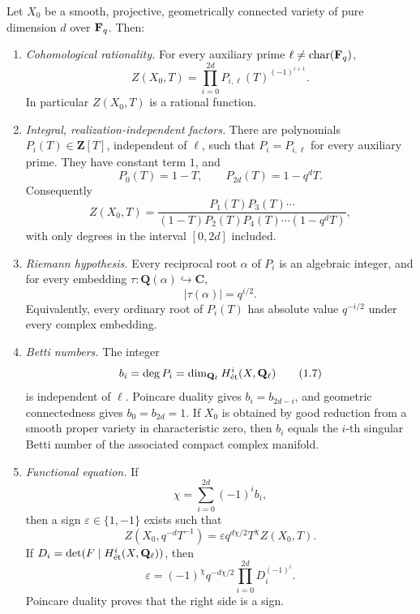 \begin{theorem}
\label{thm:weil-conjectures-statement}
Let \(X_0\) be a smooth, projective, geometrically connected variety of
pure dimension \(d\) over \(\mathbf F_q\).  Then:

\begin{enumerate}
\item \emph{Cohomological rationality.}  For every auxiliary prime
      \(\ell\neq\operatorname{char}(\mathbf F_q)\),
      \[
        Z(X_0,T)
        =\prod_{i=0}^{2d}P_{i,\ell}(T)^{(-1)^{i+1}}.
        \tag{1.4}\label{eq:weil-cohomological-factorization}
      \]
      In particular \(Z(X_0,T)\) is a rational function.

\item \emph{Integral, realization-independent factors.}  There are
      polynomials \(P_i(T)\in\mathbf Z[T]\), independent of \(\ell\),
      such that \(P_i=P_{i,\ell}\) for every auxiliary prime.  They have
      constant term \(1\), and
      \[
        P_0(T)=1-T,\qquad P_{2d}(T)=1-q^dT.
        \tag{1.5}\label{eq:weil-endpoints}
      \]
      Consequently
      \[
        Z(X_0,T)=
        \frac{P_1(T)P_3(T)\cdots}
        {(1-T)P_2(T)P_4(T)\cdots(1-q^dT)},
      \]
      with only degrees in the interval \([0,2d]\) included.

\item \emph{Riemann hypothesis.}  Every reciprocal root \(\alpha\) of
      \(P_i\) is an algebraic integer, and for every embedding
      \(\tau\colon\mathbf Q(\alpha)\hookrightarrow\mathbf C\),
      \[
        |\tau(\alpha)|=q^{i/2}.
        \tag{1.6}\label{eq:weil-rh}
      \]
      Equivalently, every ordinary root of \(P_i(T)\) has absolute value
      \(q^{-i/2}\) under every complex embedding.

\item \emph{Betti numbers.}  The integer
      \[
        b_i=\deg P_i=\dim_{\mathbf Q_\ell}H^i_{\mathrm{\acute et}}(X,\mathbf Q_\ell)
        \tag{1.7}\label{eq:weil-betti}
      \]
      is independent of \(\ell\).  Poincare duality gives
      \(b_i=b_{2d-i}\), and geometric connectedness gives
      \(b_0=b_{2d}=1\).  If \(X_0\) is obtained by good reduction from a
      smooth proper variety in characteristic zero, then \(b_i\) equals
      the \(i\)-th singular Betti number of the associated compact
      complex manifold.

\item \emph{Functional equation.}  If
      \[
        \chi=\sum_{i=0}^{2d}(-1)^ib_i,
      \]
      then a sign \(\varepsilon\in\{1,-1\}\) exists such that
      \[
        Z(X_0,q^{-d}T^{-1})
        =\varepsilon q^{d\chi/2}T^\chi Z(X_0,T).
        \tag{1.8}\label{eq:weil-functional-equation}
      \]
      If \(D_i=\det(F\mid H^i_{\mathrm{\acute et}}(X,\mathbf Q_\ell))\), then
      \[
        \varepsilon=(-1)^\chi q^{-d\chi/2}
          \prod_{i=0}^{2d}D_i^{(-1)^i}.
        \tag{1.9}\label{eq:epsilon-determinant}
      \]
      Poincare duality proves that the right side is a sign.
\end{enumerate}
\end{theorem}

